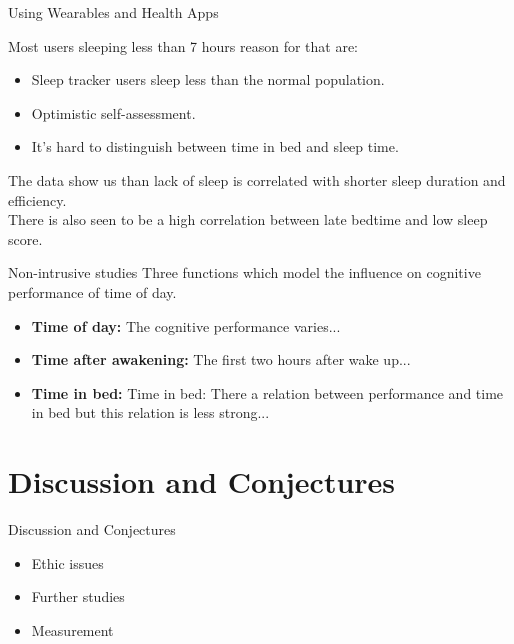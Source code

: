 \documentclass{beamer}
\begin{document}
\begin{frame}{Using Wearables and Health Apps}

Most users sleeping less than 7 hours reason for that are: \\
\begin{itemize}
    \item Sleep tracker users sleep less than the normal population. \\
    \item Optimistic self-assessment. \\
    \item It’s hard to distinguish between time in bed and sleep time. \\ 
\end{itemize}

The data show us than lack of sleep is correlated with shorter sleep duration and efficiency. \\

There is also seen to be a high correlation between late bedtime and low sleep score. \\

\end{frame}

\begin{frame}{Non-intrusive studies}
Three functions which model the influence on cognitive performance of time of day.
\begin{itemize}
    \item \textbf{Time of day:} The cognitive performance varies...
    \item \textbf{Time after awakening:}  The first two hours after wake up...
    \item \textbf{Time in bed:} Time in bed: There a relation between performance and time in bed but this relation is less strong...
\end{itemize}
\end{frame}

\section{Discussion and Conjectures}

\begin{frame}{Discussion and Conjectures}
    \begin{itemize}
        \item Ethic issues
        \item Further studies
        \item Measurement
    \end{itemize}
\end{frame}
\end{document}
